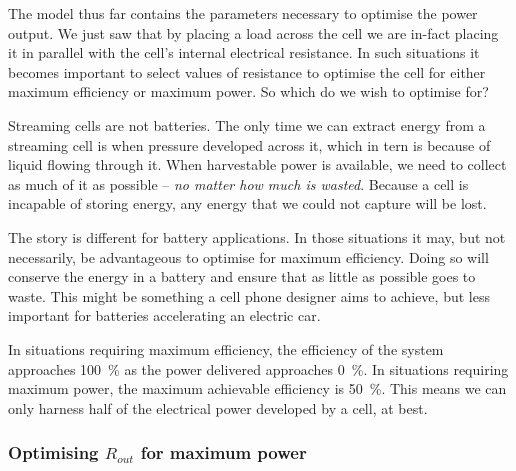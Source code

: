     The model thus far contains the parameters necessary to optimise the power output.
    We just saw that by placing a load across the cell we are in-fact placing it in parallel with the cell's internal electrical resistance.
    In such situations it becomes important to select values of resistance to optimise the cell for either maximum efficiency or maximum power.
    So which do we wish to optimise for?

    Streaming cells are not batteries.
    The only time we can extract energy from a streaming cell is when pressure developed across it, which in tern is because of liquid flowing through it.
    When harvestable power is available, we need to collect as much of it as possible -- \emph{no matter how much is wasted}.
    Because a cell is incapable of storing energy, any energy that we could not capture will be lost.

    The story is different for battery applications.
    In those situations it may, but not necessarily, be advantageous to optimise for maximum efficiency.
    Doing so will conserve the energy in a battery and ensure that as little as possible goes to waste.
    This might be something a cell phone designer aims to achieve, but less important for batteries accelerating an electric car.

    In situations requiring maximum efficiency, the efficiency of the system approaches \SI{100}{\percent} as the power delivered approaches \SI{0}{\percent}.
    In situations requiring maximum power, the maximum achievable efficiency is \SI{50}{\percent}.
    This means we can only harness half of the electrical power developed by a cell, at best.


    \subsubsection*{Optimising $R_{out}$ for maximum power}


